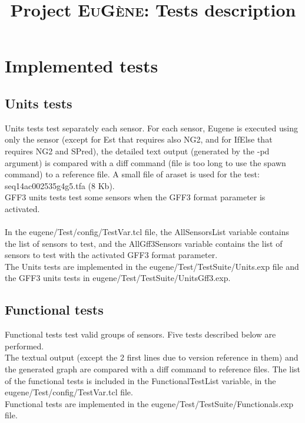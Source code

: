 \documentclass[a4paper,11pt]{article}
\newcommand{\EuGenie}{\textsc{EuG{\`e}ne}}
\begin{document}
\setlength{\parindent}{0pt}

\title{Project \EuGenie: Tests description}
\maketitle

\section{Implemented tests}

\subsection{Units tests}
Units tests test separately each sensor. For each sensor, Eugene is executed using only the sensor (except for Est that requires also NG2, and for IfElse that requires NG2 and SPred), the detailed text output (generated by the -pd argument) is compared with a diff command (file is too long to use the spawn command) to a reference file.
A small file of araset is used for the test: seq14ac002535g4g5.tfa (8 Kb). \\ 
GFF3 units tests test some sensors when the GFF3 format parameter is activated. \\ \\
In the eugene/Test/config/TestVar.tcl file, the AllSensorsList variable contains the list of sensors to test, and the AllGff3Sensors variable contains the list of sensors to test with the activated GFF3 format parameter.\\
The Units tests are implemented in the eugene/Test/TestSuite/Units.exp file and the GFF3 units tests in eugene/Test/TestSuite/UnitsGff3.exp.\\

\subsection{Functional tests}
Functional tests test valid groups of sensors. Five tests described below are performed. \\
The textual output (except the 2 first lines due to version reference in them) and the generated graph are compared with a diff command to reference files. The list of the functional tests is included in the FunctionalTestList variable, in the eugene/Test/config/TestVar.tcl file. \\ 
Functional tests are implemented in the eugene/Test/TestSuite/Functionals.exp file. \\ 
\end{document}
